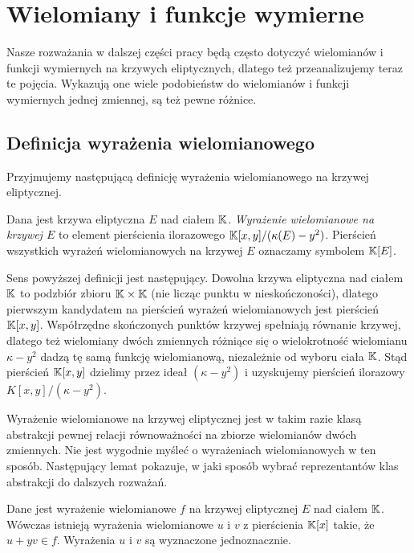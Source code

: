 \section{Wielomiany i funkcje wymierne}

\noindent
Nasze rozważania w dalszej części pracy
będą często dotyczyć
wielomianów i funkcji wymiernych na krzywych eliptycznych,
dlatego też przeanalizujemy teraz te pojęcia.
Wykazują one wiele podobieństw
do wielomianów i funkcji wymiernych jednej zmiennej,
są też pewne różnice.

\subsection*{Definicja wyrażenia wielomianowego}

\noindent
Przyjmujemy następującą definicję
wyrażenia wielomianowego na krzywej eliptycznej.

\begin{definition}
Dana jest krzywa eliptyczna $E$ nad ciałem $\mathbb{K}$.
\emph{Wyrażenie wielomianowe na krzywej $E$}
to element pierścienia ilorazowego
$\mathbb{K}[x,y]/(\kappa(E) - y^2)$.
Pierścień wszystkich wyrażeń wielomianowych na krzywej $E$
oznaczamy symbolem $\mathbb{K}[E]$.
\end{definition}

\noindent
Sens powyższej definicji jest następujący.
Dowolna krzywa eliptyczna nad ciałem $\mathbb{K}$ to podzbiór zbioru $\mathbb{K} \times \mathbb{K}$
(nie licząc punktu w nieskończoności),
dlatego pierwszym kandydatem na pierścień wyrażeń wielomianowych
jest pierścień $\mathbb{K}[x,y]$.
Współrzędne skończonych punktów krzywej spełniają równanie krzywej,
dlatego też wielomiany dwóch zmiennych różniące się
o wielokrotność wielomianu $\kappa- y^2$
dadzą tę samą funkcję wielomianową,
niezależnie od wyboru ciała $\mathbb{K}$.
Stąd pierścień $\mathbb{K}[x,y]$ dzielimy przez ideał $(\kappa- y^2)$
i uzyskujemy pierścień ilorazowy $K[x,y]/(\kappa - y^2)$.

\noindent
Wyrażenie wielomianowe na krzywej eliptycznej
jest w takim razie klasą abstrakcji
pewnej relacji równoważności na zbiorze wielomianów dwóch zmiennych.
Nie jest wygodnie myśleć o wyrażeniach wielomianowych w ten sposób.
Następujący lemat pokazuje,
w jaki sposób wybrać reprezentantów klas abstrakcji
do dalszych rozważań.

\begin{theorem}
Dane jest wyrażenie wielomianowe $f$ na krzywej eliptycznej $E$ nad ciałem $\mathbb{K}$.
Wówczas istnieją wyrażenia wielomianowe $u$ i $v$ z pierścienia $\mathbb{K}[x]$ takie,
że $u + yv \in f$.
Wyrażenia $u$ i $v$ są wyznaczone jednoznacznie.
\end{theorem}

